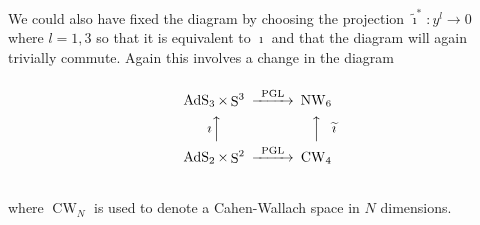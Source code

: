 \documentclass[14pt, a4paper, titlepage]{slides}
\DeclareMathOperator{\AdS}{AdS}
\DeclareMathOperator{\Sphere}{S}
\DeclareMathOperator{\NW}{NW}
\DeclareMathOperator{\CW}{CW}
\let\S\Sphere
\begin{document}
We could also have fixed the diagram by choosing the projection
$\widetilde{\imath}^*: y^l\rightarrow 0$ where $l=1,3$ so that it is equivalent
to $\imath$ and that the diagram will again trivially commute. Again this
involves a change in the diagram
\begin{equation*}
  \begin{CD}
    @.\\
    \AdS_3 \times \S^3             @>\text{PGL}>> \NW_6\\
    \text{$\imath$}@AAA @AAA\text{$\widetilde{\imath}$}\\
    \AdS_2 \times \S^2             @>\text{PGL}>> \CW_4\\
    @.
  \end{CD}
\end{equation*}
where $\CW_N$ is used to denote a Cahen-Wallach space in $N$ dimensions.
\end{document}
